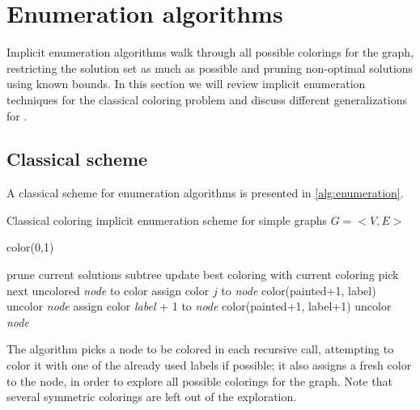 
\section{Enumeration algorithms}
\label{sec:heur}

Implicit enumeration algorithms walk through all possible colorings for the graph, restricting the solution set as much as possible and pruning non-optimal solutions using known bounds. In this section we will review implicit enumeration techniques for the classical coloring problem and discuss different generalizations for \PCP{}.

\subsection{Classical scheme}

A classical scheme for enumeration algorithms is presented in \ref{alg:enumeration}.

\begin{algorithm}
\caption{Classical coloring implicit enumeration scheme for simple graphs $G = <V,E>$}
\label{alg:enumeration}

\begin{algorithmic}
\CALL color(0,1)

		\STATE prune current solutions subtree
		\STATE update best coloring with current coloring
	\ELSE
		\STATE pick next uncolored \textit{node} to color		
				\STATE assign color $j$ to \textit{node}
				\CALL color(painted+1, label)
				\STATE uncolor \textit{node}
			\ENDIF
		\ENDFOR
		\STATE assign color \textit{label} + 1 to \textit{node}
		\CALL color(painted+1, label+1)
		\STATE uncolor \textit{node}
	\ENDIF
\ENDPROC

\end{algorithmic}
\end{algorithm}

The algorithm picks a node to be colored in each recursive call, attempting to color it with one of the already used labels if possible; it also assigns a fresh color to the node, in order to explore all possible colorings for the graph. Note that several symmetric colorings are left out of the exploration. 

